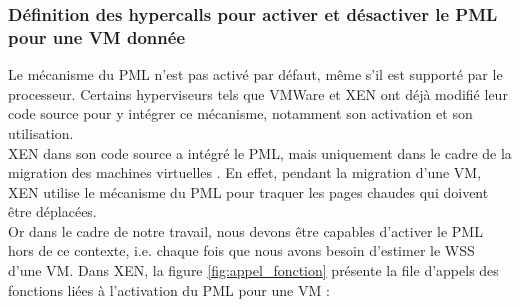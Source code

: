 \subsubsection{Définition des hypercalls pour activer et désactiver le PML pour une VM donnée}
Le mécanisme du PML n'est pas activé par défaut, même s'il est supporté par le processeur. Certains hyperviseurs tels que VMWare et XEN ont déjà modifié leur code source pour y intégrer ce mécanisme, notamment son activation et son utilisation.\\  XEN dans son code source a intégré le PML, mais uniquement dans le cadre de la migration des machines virtuelles \cite{xen_pml}. En effet, pendant la migration d'une VM, XEN utilise le mécanisme du PML pour traquer les pages chaudes qui doivent être déplacées.\\
Or dans le cadre de notre travail, nous devons être capables d'activer le PML hors de ce contexte, i.e. chaque fois que nous avons besoin d'estimer le WSS d'une VM. Dans XEN, la figure \ref{fig:appel_fonction} présente la file d'appels des fonctions liées à l'activation du PML pour une VM : 
